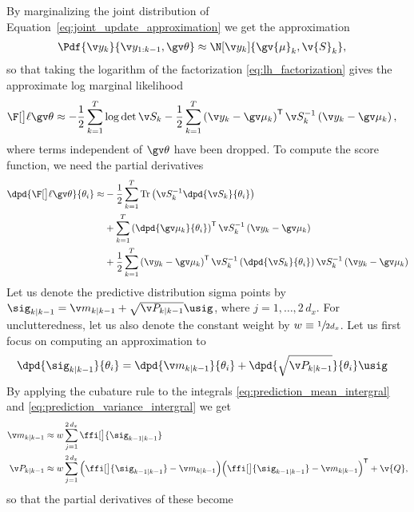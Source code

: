 By marginalizing the joint distribution of Equation~\eqref{eq:joint_update_approximation}
we get the approximation
\begin{align}
	\Pdf{\y_k}{\y_{1:k-1},\Th}&\approx \N[\yk]{\gv{\mu}_k,\v{S}_k} ,
\end{align}
so that taking the logarithm of the factorization \eqref{eq:lh_factorization} 
gives the approximate log marginal likelihood 
\begin{align}
	\lLH&\approx
	-\frac{1}{2}\sum_{k=1}^T\log\det{\S}
	-\frac{1}{2}\sum_{k=1}^T
	\left(\yk-\ym\right)^\tr
	\S^{-1}
	\left(\yk-\ym\right),
	\label{eq:nonl_logLH}
\end{align}
where terms independent of $\Th$ have been dropped.
To compute the score function, we need the partial derivatives
\begin{align}
\begin{split}
	\dpd{\lLH}{\theta_i}
	\approx&-\frac{1}{2}\sum_{k=1}^T
	\mathrm{Tr}\left(\S^{-1}\dpd{\S}{\theta_i}\right)\\
	&+\sum_{k=1}^T
	\left(\dpd{\ym}{\theta_i}\right)^\tr\S^{-1}\left(\yk-\ym\right)\\
	&+\frac{1}{2}\sum_{k=1}^T
	\left(\yk-\ym\right)^\tr\S^{-1}\left(\dpd{\S}{\theta_i}\right)\S^{-1}\left(\yk-\ym\right)\\
	\label{eq:nonl_dlogLH}
\end{split}
\end{align}
%
%
Let us denote the predictive distribution sigma points by 
$\sig_{k|k-1}=\m_{k|k-1}+\sqrt{\P_{k|k-1}}\usig$, where $j=1,\dots,2\,d_x$.
For unclutteredness, let us also denote the constant
weight by $w\equiv \sfrac{1}{2d_x}$. Let us first focus on computing
an approximation to 
\begin{align}
	\dpd{\sig_{k|k-1}}{\theta_i}&= \dpd{\m_{k|k-1}}{\theta_i}+ \dpd{\sqrt{\P_{k|k-1}}}{\theta_i}\usig
	\label{eq:dSig_pred}
\end{align}
By applying the cubature rule to the integrals \eqref{eq:prediction_mean_intergral} and 
\eqref{eq:prediction_variance_intergral} 
we get   
%
\begin{align}
	\m_{k|k-1} &\approx{} w \sum_{j=1}^{2\,d_x} \ffi[\big]{\sig_{k-1|k-1}} \\
	\P_{k|k-1} &\approx{} w \sum_{j=1}^{2\,d_x}%
	\Big(\ffi[\big]{\sig_{k-1|k-1}}-\m_{k|k-1}\Big)%
	\Big(\ffi[\big]{\sig_{k-1|k-1}}-\m_{k|k-1}\Big)^\tr%
	+\v{Q},
	\label{tablelabel}
\end{align}
so that the partial derivatives of these become
